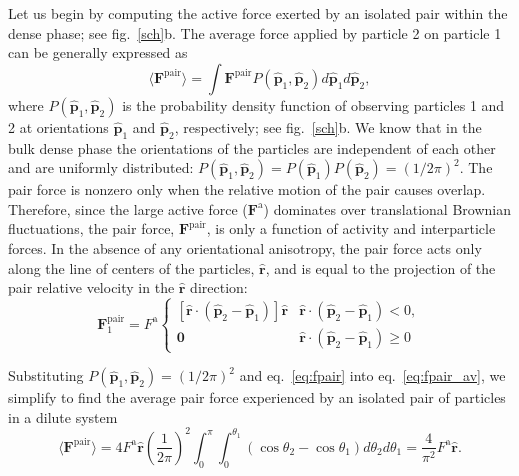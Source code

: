 \documentclass[twoside,twocolumn,9pt]{article}
\begin{document}
Let us begin by computing the active force exerted by an isolated pair within the dense phase; see fig.~\ref{sch}b. The average force applied by particle 2 on particle 1 can be generally expressed as 
\begin{equation}
     \langle\mathbf{F}^\text{pair}\rangle= \int \mathbf{F}^\text{pair} P(\hat{\mathbf{p}}_1, \hat{\mathbf{p}}_2)d\hat{\mathbf{p}}_1 d\hat{\mathbf{p}}_2,
    \label{eq:fpair_av}
\end{equation}
where $P(\hat{\mathbf{p}}_1, \hat{\mathbf{p}}_2)$ is the probability density function of observing particles 1 and 2 at orientations $\hat{\mathbf{p}}_1$ and $\hat{\mathbf{p}}_2$, respectively; see fig.~\ref{sch}b. We know that in the bulk dense phase the orientations of the particles are independent of each other and are uniformly distributed:  
$P(\hat{\mathbf{p}}_1, \hat{\mathbf{p}}_2)=P(\hat{\mathbf{p}}_1)P(\hat{\mathbf{p}}_2)=(1/2\pi)^2$. The pair force is nonzero only when the relative motion of the pair causes overlap. Therefore, since the large active force ($\mathbf{F}^\text{a}$) dominates over translational Brownian fluctuations, the pair force, $\mathbf{F}^\text{pair}$, is only a function of activity and interparticle forces. In the absence of any orientational anisotropy,  the pair force acts only along the line of centers of the particles, $\hat{\mathbf{r}}$, and is equal to the projection of the pair relative velocity in the $\hat{\mathbf{r}}$ direction:
\begin{equation}
\mathbf{F}^\text{pair}_1=F^\text{a}
    \begin{cases}
    \left[\hat{\mathbf{r}}\cdot \left(\hat{\mathbf{p}}_2-\hat{\mathbf{p}}_1\right)\right]\hat{\mathbf{r}} & \hat{\mathbf{r}}\cdot \left(\hat{\mathbf{p}}_2-\hat{\mathbf{p}}_1\right)<0, \\
    \mathbf{0} & \hat{\mathbf{r}}\cdot \left(\hat{\mathbf{p}}_2-\hat{\mathbf{p}}_1\right)\ge 0 
    \end{cases}
    \label{eq:fpair}
\end{equation}

\noindent Substituting $P(\hat{\mathbf{p}}_1, \hat{\mathbf{p}}_2)={(1/2\pi)}^2$ and eq.~\ref{eq:fpair} into eq.~\ref{eq:fpair_av}, we simplify to find the average pair force experienced by an isolated pair of particles in a dilute system
\begin{equation} \label{eq:dilutepredict}
     \langle\mathbf{F}^\text{pair}\rangle = 4 F^\text{a} \hat{\mathbf{r}}{(\frac{1}{2\pi})}^2 \int_0^\pi \int_0^{\theta_1} \left(\cos \theta_2-\cos \theta_1\right)d\theta_2d\theta_1=\frac{4}{\pi^2} F^\text{a} \hat{\mathbf{r}}. 
\end{equation}
\end{document}
